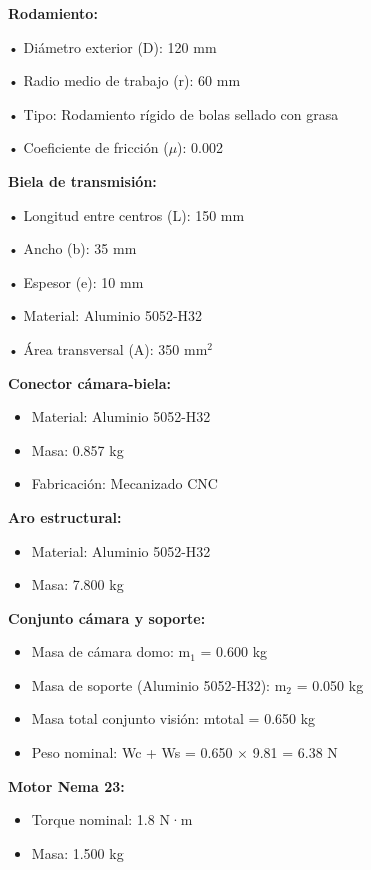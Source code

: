 \documentclass[12pt,a4paper,oneside]{report}
\begin{document}
\textbf{Rodamiento:}

• Diámetro exterior (D): 120 mm

• Radio medio de trabajo (r): 60 mm

• Tipo: Rodamiento rígido de bolas sellado con grasa

• Coeficiente de fricción (\ensuremath{\mu}): 0.002

\textbf{Biela de transmisión:}

• Longitud entre centros (L): 150 mm

• Ancho (b): 35 mm

• Espesor (e): 10 mm

• Material: Aluminio 5052-H32

• Área transversal (A): 350 mm\ensuremath{^{2}}

\textbf{Conector cámara-biela:}

\begin{itemize}
\item
  Material: Aluminio 5052-H32
\item
  Masa: 0.857 kg
\item
  Fabricación: Mecanizado CNC
\end{itemize}

\textbf{Aro estructural:}

\begin{itemize}
\item
  Material: Aluminio 5052-H32
\item
  Masa: 7.800 kg
\end{itemize}

\textbf{Conjunto cámara y soporte:}

\begin{itemize}
\item
  Masa de cámara domo: m\ensuremath{_{1}} = 0.600 kg
\item
  Masa de soporte (Aluminio 5052-H32): m\ensuremath{_{2}} = 0.050 kg
\item
  Masa total conjunto visión: mtotal = 0.650 kg
\item
  Peso nominal: Wc + Ws = 0.650 \ensuremath{\times} 9.81 = 6.38 N
\end{itemize}

\textbf{Motor Nema 23:}

\begin{itemize}
\item
  Torque nominal: 1.8 N·m
\item
  Masa: 1.500 kg
\end{itemize}
\end{document}
